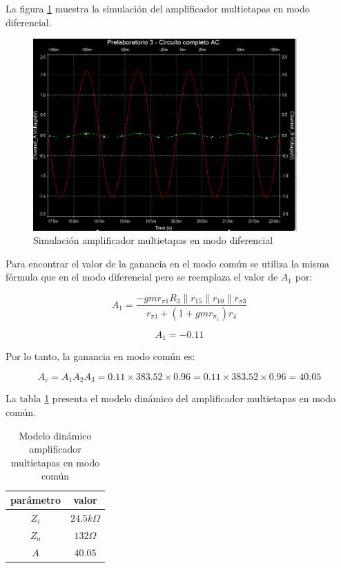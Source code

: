 La figura \ref{fig:sim-amp-multietapas-mod-diferencial} muestra la simulación del amplificador multietapas en modo diferencial.

\begin{figure}[ht]
    \centering
    \includegraphics[width=0.9\textwidth]{src/images/p3/multietapa-modo-diff-ganancia.png}
    \caption{Simulación amplificador multietapas en modo diferencial}
    \label{fig:sim-amp-multietapas-mod-diferencial} 
\end{figure}

Para encontrar el valor de la ganancia en el modo común se utiliza la misma fórmula que en el modo diferencial pero se reemplaza el valor de $A_1$ por:

$$ A_1 = \frac{-gmr_{\pi1} R_3 \parallel r_{15} \parallel r_{10} \parallel r_{\pi3}}{r_{\pi1} + (1+ gmr_{\pi_1})r_4}$$

$$ A_1 = -0.11 $$

Por lo tanto, la ganancia en modo común es:

$$ A_c = A_1 A_2 A_3 = 0.11 \times 383.52 \times 0.96 = 0.11 \times 383.52 \times 0.96 = 40.05 $$

La tabla \ref{tab:met-amp-multietapas-mod-comun} presenta el modelo dinámico del amplificador multietapas en modo común.

\begin{table}[ht]
    \centering
    \begin{tabular}{|c|c|}
        \hline
        parámetro & valor  \\
        \hline
        $Z_i$ & $24.5k\Omega$ \\
        \hline
        $Z_o$ & $132\Omega$ \\
        \hline
        $A$ & $40.05$ \\
        \hline
    \end{tabular}
    \caption{Modelo dinámico amplificador multietapas en modo común}
    \label{tab:met-amp-multietapas-mod-comun}
\end{table}

